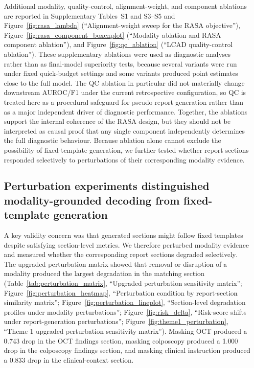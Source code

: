 Additional modality, quality-control, alignment-weight, and component ablations are reported in Supplementary Tables~S1 and S3--S5 and Figure~\ref{fig:rasa_lambda} (``Alignment-weight sweep for the RASA objective''), Figure~\ref{fig:rasa_component_boxenplot} (``Modality ablation and RASA component ablation''), and Figure~\ref{fig:qc_ablation} (``LCAD quality-control ablation''). These supplementary ablations were used as diagnostic analyses rather than as final-model superiority tests, because several variants were run under fixed quick-budget settings and some variants produced point estimates close to the full model. The QC ablation in particular did not materially change downstream AUROC/F1 under the current retrospective configuration, so QC is treated here as a procedural safeguard for pseudo-report generation rather than as a major independent driver of diagnostic performance. Together, the ablations support the internal coherence of the RASA design, but they should not be interpreted as causal proof that any single component independently determines the full diagnostic behaviour. Because ablation alone cannot exclude the possibility of fixed-template generation, we further tested whether report sections responded selectively to perturbations of their corresponding modality evidence.

\subsection{Perturbation experiments distinguished modality-grounded decoding from fixed-template generation}
\label{subsec:perturbation_results}

A key validity concern was that generated sections might follow fixed templates despite satisfying section-level metrics. We therefore perturbed modality evidence and measured whether the corresponding report sections degraded selectively. The upgraded perturbation matrix showed that removal or disruption of a modality produced the largest degradation in the matching section (Table~\ref{tab:perturbation_matrix}, ``Upgraded perturbation sensitivity matrix''; Figure~\ref{fig:perturbation_heatmap}, ``Perturbation condition by report-section similarity matrix''; Figure~\ref{fig:perturbation_lineplot}, ``Section-level degradation profiles under modality perturbations''; Figure~\ref{fig:risk_delta}, ``Risk-score shifts under report-generation perturbations''; Figure~\ref{fig:theme1_perturbation}, ``Theme 1 upgraded perturbation sensitivity matrix''). Masking OCT produced a 0.743 drop in the OCT findings section, masking colposcopy produced a 1.000 drop in the colposcopy findings section, and masking clinical instruction produced a 0.833 drop in the clinical-context section.


